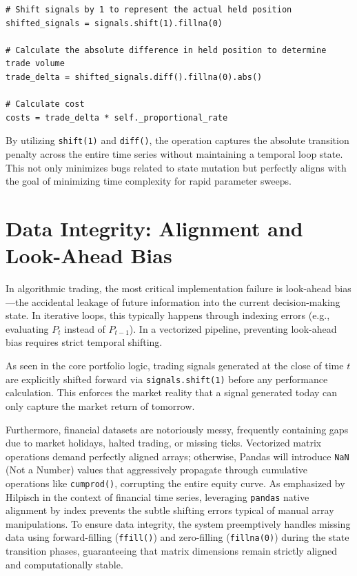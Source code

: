 \begin{verbatim}
# Shift signals by 1 to represent the actual held position
shifted_signals = signals.shift(1).fillna(0)

# Calculate the absolute difference in held position to determine trade volume
trade_delta = shifted_signals.diff().fillna(0).abs()

# Calculate cost
costs = trade_delta * self._proportional_rate
\end{verbatim}

By utilizing \texttt{shift(1)} and \texttt{diff()}, the operation captures the absolute transition penalty across the entire time series without maintaining a temporal loop state. This not only minimizes bugs related to state mutation but perfectly aligns with the goal of minimizing time complexity for rapid parameter sweeps.

\section{Data Integrity: Alignment and Look-Ahead Bias}

In algorithmic trading, the most critical implementation failure is look-ahead bias---the accidental leakage of future information into the current decision-making state. In iterative loops, this typically happens through indexing errors (e.g., evaluating \( P_t \) instead of \( P_{t-1} \)). In a vectorized pipeline, preventing look-ahead bias requires strict temporal shifting. 

As seen in the core portfolio logic, trading signals generated at the close of time \( t \) are explicitly shifted forward via \texttt{signals.shift(1)} before any performance calculation. This enforces the market reality that a signal generated today can only capture the market return of tomorrow.

Furthermore, financial datasets are notoriously messy, frequently containing gaps due to market holidays, halted trading, or missing ticks. Vectorized matrix operations demand perfectly aligned arrays; otherwise, Pandas will introduce \texttt{NaN} (Not a Number) values that aggressively propagate through cumulative operations like \texttt{cumprod()}, corrupting the entire equity curve. As emphasized by Hilpisch \cite{hilpisch2018} in the context of financial time series, leveraging \texttt{pandas} native alignment by index prevents the subtle shifting errors typical of manual array manipulations. To ensure data integrity, the system preemptively handles missing data using forward-filling (\texttt{ffill()}) and zero-filling (\texttt{fillna(0)}) during the state transition phases, guaranteeing that matrix dimensions remain strictly aligned and computationally stable.

